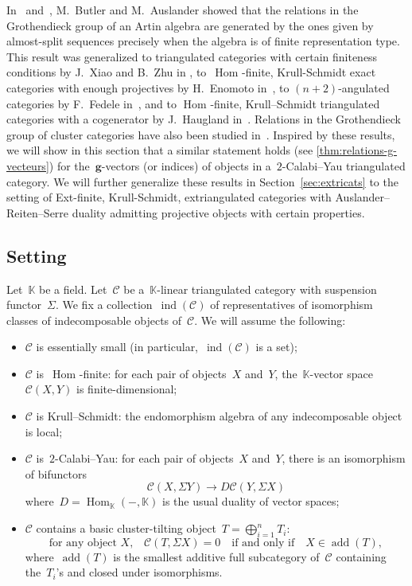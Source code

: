 \documentclass{amsart}
\theoremstyle{definition}
\renewcommand{\b}[1]{{\boldsymbol{#1}}} %
\newcommand{\field}{\mathbb{K}}
\newcommand{\cat}{\mathcal{C}}
\newcommand{\Hom}[1]{\operatorname{Hom}_{#1}}
\newcommand{\susp}{\Sigma}
\newcommand{\add}{\operatorname{add}}
\newcommand{\ind}{\operatorname{ind}}
\begin{document}
In~\cite{Butler} and~\cite{Auslander1984}, M.~Butler and M.~Auslander showed that the relations in the Grothendieck group of an Artin algebra are generated by the ones given by almost-split sequences precisely when the algebra is of finite representation type.  This result was generalized to triangulated categories with certain finiteness conditions by J.~Xiao and B.~Zhu in \cite{XiaoZhu}, to~$\Hom{}$-finite, Krull-Schmidt exact categories with enough projectives by H.~Enomoto in~\cite{Enomoto}, to $(n+2)$-angulated categories by F.~Fedele in~\cite{Fedele}, and to $\Hom{}$-finite, Krull--Schmidt triangulated categories with a cogenerator by J.~Haugland in~\cite{Haugland}. Relations in the Grothendieck group of cluster categories have also been studied in~\cite{Palu-grothendieckGroup}.  Inspired by these results, we will show in this section that a similar statement holds (see \cref{thm:relations-g-vecteurs}) for the~$\b{g}$-vectors (or indices) of objects in a~$2$-Calabi--Yau triangulated category.  We will further generalize these results in Section~\ref{sec:extricats} to the setting of Ext-finite, Krull-Schmidt, extriangulated categories with Auslander--Reiten--Serre duality admitting projective objects with certain properties.


\subsection{Setting}
\label{sec:setting}

Let~$\field$ be a field. Let~$\cat$ be a~$\field$-linear triangulated category with suspension functor~$\susp$. We fix a collection~$\ind(\cat)$ of representatives of isomorphism classes of indecomposable objects of~$\cat$. We will assume the following:
\begin{itemize}
\item $\cat$ is essentially small (in particular,~$\ind(\cat)$ is a set);
\item $\cat$ is~$\Hom{}$-finite: for each pair of objects~$X$ and~$Y$, the~$\field$-vector space~$\cat(X,Y)$ is finite-dimensional;
\item $\cat$ is Krull--Schmidt: the endomorphism algebra of any indecomposable object is local;
\item $\cat$ is~$2$-Calabi--Yau: for each pair of objects~$X$ and~$Y$, there is an isomorphism of bifunctors
\[
\cat(X,\susp Y) \to D\cat(Y,\susp X)
\]
where~$D = \Hom{\field}(-,\field)$ is the usual duality of vector spaces;
\item $\cat$ contains a basic cluster-tilting object~$T = \bigoplus_{i=1}^n T_i$:
\[
\textrm{for any object~$X$,} \quad \cat(T, \susp X) = 0 \quad \textrm{if and only if} \quad X \in \add(T),
\]
where~$\add(T)$ is the smallest additive full subcategory of~$\cat$ containing the~$T_i$'s and closed under isomorphisms.
\end{itemize}
\end{document}
